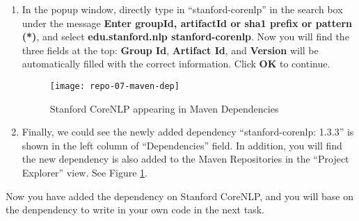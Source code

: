 \begin{enumerate}
\item In the popup window, directly type in ``stanford-corenlp'' in the search box under the message \textbf{Enter groupId, artifactId or sha1 prefix or pattern (*)}, and select \textbf{edu.stanford.nlp stanford-corenlp}. Now you will find the three fields at the top: \textbf{Group Id}, \textbf{Artifact Id}, and \textbf{Version} will be automatically filled with the correct information. Click \textbf{OK} to continue.

\begin{figure}[t]
\centering
\texttt{[image: repo-07-maven-dep]}
\caption{Stanford CoreNLP appearing in Maven Dependencies\label{repo-07-maven-dep}}
\end{figure}

\item Finally, we could see the newly added dependency ``stanford-corenlp: 1.3.3'' is shown in the left column of ``Dependencies'' field. In addition, you will find the new dependency is also added to the Maven Repositories in the ``Project Explorer'' view. See Figure \ref{repo-07-maven-dep}.

\end{enumerate}

Now you have added the dependency on Stanford CoreNLP, and you will base on the denpendency to write in your own code in the next task.
